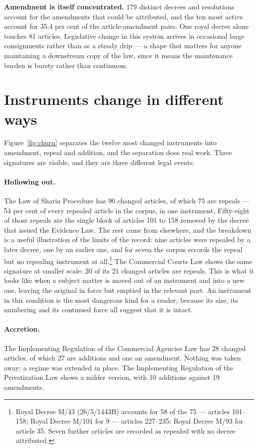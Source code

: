 \documentclass[11pt]{article}
\begin{document}
\textbf{Amendment is itself concentrated.} 179 distinct decrees and
resolutions account for the amendments that could be attributed, and the ten
most active account for 35.4 per cent of the article-amendment pairs. One
royal decree alone touches 81 articles. Legislative change in this system
arrives in occasional large consignments rather than as a steady drip --- a
shape that matters for anyone maintaining a downstream copy of the law, since
it means the maintenance burden is bursty rather than continuous.

\section{Instruments change in different ways}

Figure~\ref{fig:churn} separates the twelve most changed instruments into
amendment, repeal and addition, and the separation does real work. Three
signatures are visible, and they are three different legal events.

\paragraph{Hollowing out.} The Law of Sharia Procedure has 90 changed
articles, of which 75 are repeals --- 54 per cent of every repealed article in
the corpus, in one instrument. Fifty-eight of those repeals are the single
block of articles 101 to 158 removed by the decree that issued the Evidence
Law. The rest came from elsewhere, and the breakdown is a useful illustration
of the limits of the record: nine articles were repealed by a later decree,
one by an earlier one, and for seven the corpus records the repeal but no
repealing instrument at all.\footnote{Royal Decree M/43 (26/5/1443H) accounts
for 58 of the 75 --- articles 101--158; Royal Decree M/101 for 9 --- articles
227--235; Royal Decree M/93 for article 35. Seven further articles are
recorded as repealed with no decree attributed.} The
Commercial Courts Law shows the same signature at smaller scale: 20 of its 21
changed articles are repeals. This is
what it looks like when a subject matter is moved out of an instrument and
into a new one, leaving the original in force but emptied in the relevant part.
An instrument in this condition is the most dangerous kind for a reader,
because its size, its numbering and its continued force all suggest that it is
intact.

\paragraph{Accretion.} The Implementing Regulation of the Commercial Agencies
Law has 28 changed articles, of which 27 are additions and one an amendment.
Nothing was taken away; a regime was extended in place. The Implementing
Regulation of the Privatization Law shows a milder version, with 10 additions
against 19 amendments.
\end{document}
